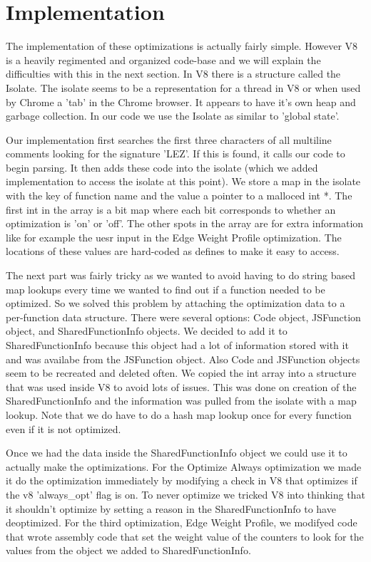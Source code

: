 \documentclass[twocolumn,showpacs,%
  nofootinbib,aps,superscriptaddress,%
  eqsecnum,prd,notitlepage,showkeys,10pt]{revtex4-1}
\begin{document}
\section{Implementation}
The implementation of these optimizations is actually fairly simple. However V8 is a heavily regimented and organized code-base and we will explain the difficulties with this in the next section. In V8 there is a structure called the Isolate. The isolate seems to be a representation for a thread in V8 or when used by Chrome a 'tab' in the Chrome browser. It appears to have it's own heap and garbage collection. In our code we use the Isolate as similar to 'global state'.

Our implementation first searches the first three characters of all multiline comments looking for the signature 'LEZ'. If this is found, it calls our code to begin parsing. It then adds these code into the isolate (which we added implementation to access the isolate at this point). We store a map in the isolate with the key of function name and the value a pointer to a malloced int *. The first int in the array is a bit map where each bit corresponds to whether an optimization is 'on' or 'off'. The other spots in the array are for extra information like for example the uesr input in the Edge Weight Profile optimization. The locations of these values are hard-coded as defines to make it easy to access.

The next part was fairly tricky as we wanted to avoid having to do string based map lookups every time we wanted to find out if a function needed to be optimized. So we solved this problem by attaching the optimization data to a per-function data structure. There were several options: Code object, JSFunction object, and SharedFunctionInfo objects. We decided to add it to SharedFunctionInfo because this object had a lot of information stored with it and was availabe from the JSFunction object. Also Code and JSFunction objects seem to be recreated and deleted often. We copied the int array into a structure that was used inside V8 to avoid lots of issues. This was done on creation of the SharedFunctionInfo and the information was pulled from the isolate with a map lookup. Note that we do have to do a hash map lookup once for every function even if it is not optimized.

Once we had the data inside the SharedFunctionInfo object we could use it to actually make the optimizations. For the Optimize Always optimization we made it do the optimization immediately by modifying a check in V8 that optimizes if the v8 'always\_opt' flag is on. To never optimize we tricked V8 into thinking that it shouldn't optimize by setting a reason in the SharedFunctionInfo to have deoptimized. For the third optimization, Edge Weight Profile, we modifyed code that wrote assembly code that set the weight value of the counters to look for the values from the object we added to SharedFunctionInfo.
\end{document}
